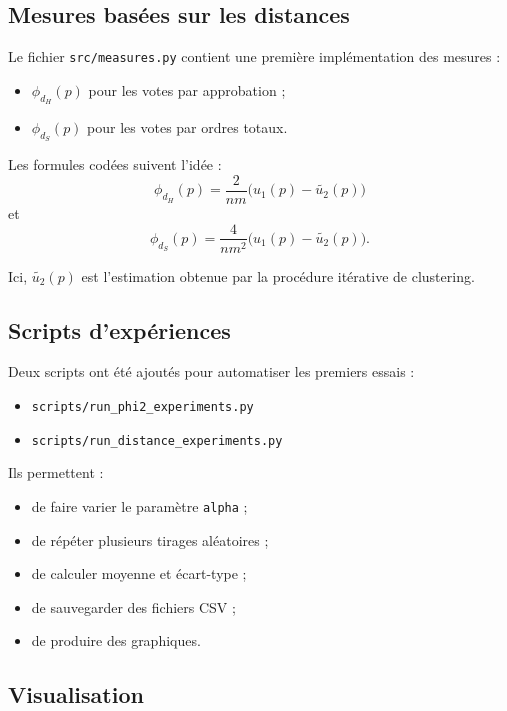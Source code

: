 \documentclass[11pt,a4paper]{article}
\begin{document}
\subsection{Mesures bas\'ees sur les distances}

Le fichier \texttt{src/measures.py} contient une premi\`ere impl\'ementation des mesures :
\begin{itemize}[leftmargin=*]
    \item \(\phi_{d_H}(p)\) pour les votes par approbation ;
    \item \(\phi_{d_S}(p)\) pour les votes par ordres totaux.
\end{itemize}

Les formules cod\'ees suivent l'id\'ee :
\[
\phi_{d_H}(p) = \frac{2}{nm}\bigl(u_1(p) - \widetilde{u_2}(p)\bigr)
\]
et
\[
\phi_{d_S}(p) = \frac{4}{nm^2}\bigl(u_1(p) - \widetilde{u_2}(p)\bigr).
\]

Ici, \(\widetilde{u_2}(p)\) est l'estimation obtenue par la proc\'edure it\'erative de clustering.

\subsection{Scripts d'exp\'eriences}

Deux scripts ont \'et\'e ajout\'es pour automatiser les premiers essais :
\begin{itemize}[leftmargin=*]
    \item \texttt{scripts/run\_phi2\_experiments.py}
    \item \texttt{scripts/run\_distance\_experiments.py}
\end{itemize}

Ils permettent :
\begin{itemize}[leftmargin=*]
    \item de faire varier le param\`etre \texttt{alpha} ;
    \item de r\'ep\'eter plusieurs tirages al\'eatoires ;
    \item de calculer moyenne et \'ecart-type ;
    \item de sauvegarder des fichiers CSV ;
    \item de produire des graphiques.
\end{itemize}

\subsection{Visualisation}
\end{document}
